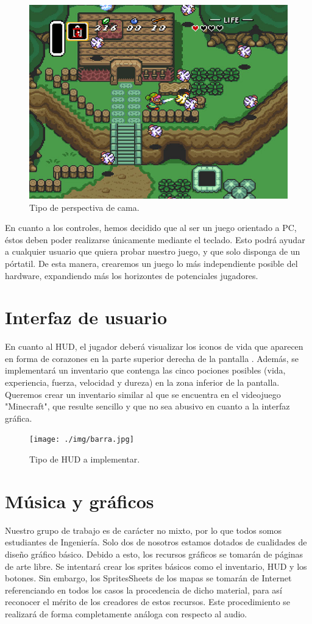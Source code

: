 \begin{figure}[!htb]
  \centering
    \includegraphics[width=\linewidth]{./img/camara.jpg}
    \caption{Tipo de perspectiva de cama.}
  \label{fig:yo}
\end{figure}
En cuanto a los controles, hemos decidido que al ser un juego orientado a PC, éstos deben poder realizarse únicamente mediante el teclado. Esto podrá ayudar a cualquier usuario que quiera probar nuestro juego, y que solo disponga de un pórtatil. De esta manera, crearemos un juego lo más independiente posible del hardware, expandiendo más los horizontes de potenciales jugadores.

\section{Interfaz de usuario}
En cuanto al HUD, el jugador deberá visualizar los iconos de vida que aparecen en forma de corazones en la parte superior derecha de la pantalla . Además, se implementará un inventario que contenga las cinco pociones posibles (vida, experiencia, fuerza, velocidad y dureza) en la zona inferior de la pantalla. Queremos crear un inventario similar al que se encuentra en el videojuego "Minecraft", que resulte sencillo y que no sea abusivo en cuanto a la interfaz gráfica.

\begin{figure}[!htb]
  \centering
    \texttt{[image: ./img/barra.jpg]}
    \caption{Tipo de HUD a implementar.}
  \label{fig:yo}
\end{figure}
\newpage
\section{Música y gráficos}
Nuestro grupo de trabajo es de carácter no mixto, por lo que todos somos estudiantes de Ingeniería. Solo dos de nosotros estamos dotados de cualidades de diseño gráfico básico. 
Debido a esto, los recursos gráficos se tomarán de páginas de arte libre. Se intentará crear los sprites básicos como el inventario, HUD y los botones. Sin embargo, los SpritesSheets de los mapas se tomarán de Internet referenciando en todos los casos la procedencia de dicho material, para así reconocer el mérito de los creadores de estos recursos. Este procedimiento se realizará de forma completamente análoga con respecto al audio.

